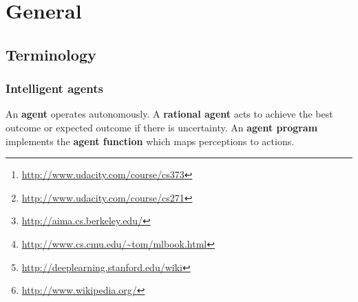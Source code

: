 \documentclass{report}
\begin{document}
\begin{abstract}
\begin{itemize}
\item Sebastian Thrun. {\em CS373 Artificial Intelligence for Robotics}. Udacity.\footnote{\url{http://www.udacity.com/course/cs373}}
\item Sebastian Thrun and Peter Norvig. {\em CS271 Intro to Artificial Intelligence}. Udacity.\footnote{\url{http://www.udacity.com/course/cs271}}
\item Stuart Russell and Peter Norvig. {\em Artificial Intelligence: A Modern Approach}. Third edition.\footnote{\url{http://aima.cs.berkeley.edu/}}
\item Tom Mitchell. {\em Machine Learning}. \footnote{\url{http://www.cs.cmu.edu/~tom/mlbook.html}}
\item {\em Unsupervised Feature Learning and Deep Learning}. Stanford University. \footnote{\url{http://deeplearning.stanford.edu/wiki}}
\item {\em Wikipedia}. Various articles.\footnote{\url{http://www.wikipedia.org/}}
\end{itemize}

With reference to the purpose of this document, it does not contain original research. Quite the opposite, various statements were copied directly from other sources.

~\\~\\~\\~\\
\begin{flushright}
Patrick GLAUNER
\end{flushright}

\end{abstract}


\chapter{General}
\section{Terminology}
\subsection{Intelligent agents}
An {\bf agent} operates autonomously. A {\bf rational agent} acts to achieve the best outcome or expected outcome if there is uncertainty. An {\bf agent program} implements the {\bf agent function} which maps perceptions to actions.
\end{document}
